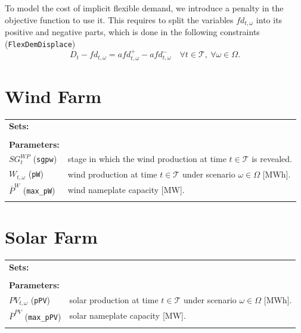 \documentclass{article}
\begin{document}
To model the cost of implicit flexible demand, we introduce a penalty in the objective function to use it. This requires to split the variables $fd_{t, \omega}$ into its positive and negative parts, which is done in the following constraints (\verb|FlexDemDisplace|)
\begin{equation} \label{EQ:FlexDemDisplace}
	D_t - fd_{t, \omega} = afd_{t, \omega}^+ - afd_{t, \omega}^- \quad \forall t \in \mathcal{T}, \ \forall \omega \in \Omega.
\end{equation}



\section{Wind Farm}
\label{SEC:WindFarm}

\begin{tabularx}{\textwidth}{l l}
    \textbf{Sets:} \\
    \\
    
    \textbf{Parameters:} \\
	$SG^{WP}_t$ (\verb|sgpw|) & stage in which the wind production at time $t \in \mathcal{T}$ is revealed. \\
	$W_{t, \omega}$ (\verb|pW|) & wind production at time $t \in \mathcal{T}$ under scenario $\omega \in \Omega$ [MWh]. \\
	$\overline{P}^W$ (\verb|max_pW|) & wind nameplate capacity [MW]. \\
	\\  
\end{tabularx}

\section{Solar Farm}
\label{SEC:SolarFarm}

\begin{tabularx}{\textwidth}{l l}
    \textbf{Sets:} \\
    \\
    
    \textbf{Parameters:} \\
	$PV_{t, \omega}$ (\verb|pPV|) & solar production at time $t \in \mathcal{T}$ under scenario $\omega \in \Omega$ [MWh]. \\
	$\overline{P}^{PV}$ (\verb|max_pPV|) & solar nameplate capacity [MW]. \\
	\\  
\end{tabularx}
\end{document}
